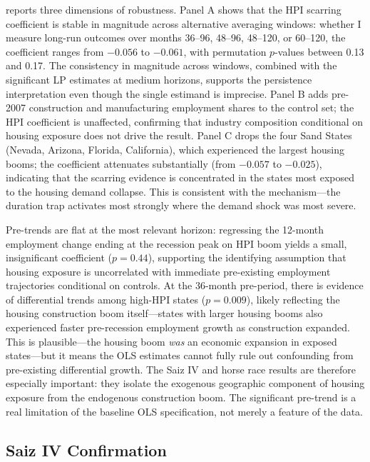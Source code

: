 \documentclass[12pt]{article}
\begin{document}


 reports three dimensions of robustness. Panel A shows that the HPI scarring coefficient is stable in magnitude across alternative averaging windows: whether I measure long-run outcomes over months 36--96, 48--96, 48--120, or 60--120, the coefficient ranges from $-0.056$ to $-0.061$, with permutation $p$-values between 0.13 and 0.17. The consistency in magnitude across windows, combined with the significant LP estimates at medium horizons, supports the persistence interpretation even though the single estimand is imprecise. Panel B adds pre-2007 construction and manufacturing employment shares to the control set; the HPI coefficient is unaffected, confirming that industry composition conditional on housing exposure does not drive the result. Panel C drops the four Sand States (Nevada, Arizona, Florida, California), which experienced the largest housing booms; the coefficient attenuates substantially (from $-0.057$ to $-0.025$), indicating that the scarring evidence is concentrated in the states most exposed to the housing demand collapse. This is consistent with the mechanism---the duration trap activates most strongly where the demand shock was most severe.

Pre-trends are flat at the most relevant horizon: regressing the 12-month employment change ending at the recession peak on HPI boom yields a small, insignificant coefficient ($p = 0.44$), supporting the identifying assumption that housing exposure is uncorrelated with immediate pre-existing employment trajectories conditional on controls. At the 36-month pre-period, there is evidence of differential trends among high-HPI states ($p = 0.009$), likely reflecting the housing construction boom itself---states with larger housing booms also experienced faster pre-recession employment growth as construction expanded. This is plausible---the housing boom \textit{was} an economic expansion in exposed states---but it means the OLS estimates cannot fully rule out confounding from pre-existing differential growth. The Saiz IV and horse race results are therefore especially important: they isolate the exogenous geographic component of housing exposure from the endogenous construction boom. The significant pre-trend is a real limitation of the baseline OLS specification, not merely a feature of the data.

\subsection{Saiz IV Confirmation}
\end{document}
